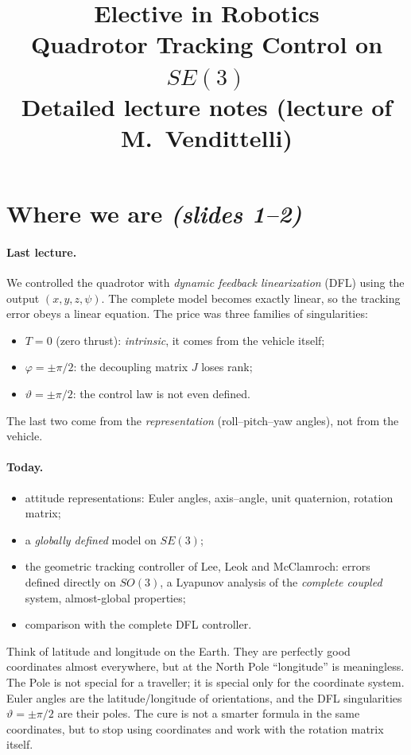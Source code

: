 \documentclass[11pt,a4paper]{article}
\title{\textbf{Elective in Robotics}\\[4pt]
Quadrotor Tracking Control on $SE(3)$\\[4pt]
\large Detailed lecture notes (lecture of M.~Vendittelli)}
\author{}
\date{}
\newcommand{\sli}[1]{\emph{(#1)}}
\theoremstyle{definition}
\theoremstyle{plain}
\theoremstyle{remark}
\begin{document}
\maketitle
\tableofcontents
\newpage

\section{Where we are \sli{slides 1--2}}

\paragraph{Last lecture.} We controlled the quadrotor with \emph{dynamic feedback linearization} (DFL) using the output $(x,y,z,\psi)$. The complete model becomes exactly linear, so the tracking error obeys a linear equation. The price was three families of singularities:
\begin{itemize}
  \item $T=0$ (zero thrust): \emph{intrinsic}, it comes from the vehicle itself;
  \item $\varphi=\pm\pi/2$: the decoupling matrix $J$ loses rank;
  \item $\vartheta=\pm\pi/2$: the control law is not even defined.
\end{itemize}
The last two come from the \emph{representation} (roll--pitch--yaw angles), not from the vehicle.

\paragraph{Today.}
\begin{itemize}
  \item attitude representations: Euler angles, axis--angle, unit quaternion, rotation matrix;
  \item a \emph{globally defined} model on $SE(3)$;
  \item the geometric tracking controller of Lee, Leok and McClamroch: errors defined directly on $SO(3)$, a Lyapunov analysis of the \emph{complete coupled} system, almost-global properties;
  \item comparison with the complete DFL controller.
\end{itemize}

\begin{intuition}
Think of latitude and longitude on the Earth. They are perfectly good coordinates almost everywhere, but at the North Pole ``longitude'' is meaningless. The Pole is not special for a traveller; it is special only for the coordinate system. Euler angles are the latitude/longitude of orientations, and the DFL singularities $\vartheta=\pm\pi/2$ are their poles. The cure is not a smarter formula in the same coordinates, but to stop using coordinates and work with the rotation matrix itself.
\end{intuition}
\end{document}
